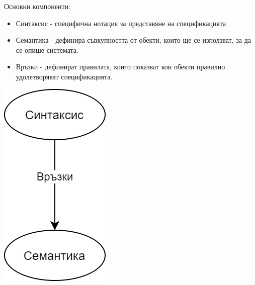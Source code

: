 \documentclass[fleqn,12pt]{article}
\begin{document}
\begin{multicols}{2}

Основни компоненти:
\begin{itemize}
	\item Синтаксис - специфична нотация за представяне на спецификацията
	\item Семантика - дефинира съвкупността от обекти, които ще се използват, за да се опише системата.
	\item Връзки - дефинират правилата, които показват кои обекти правилно удолетворяват спецификацията.
\end{itemize}

\includegraphics[scale=.4]{FD}

\end{multicols}
\end{document}
